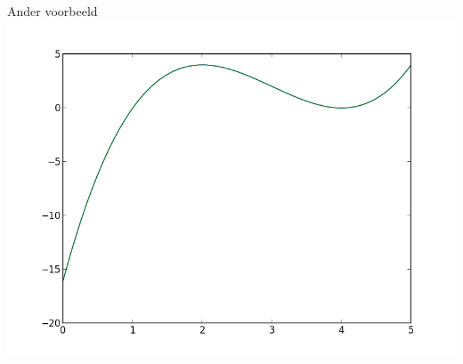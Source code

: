 \documentclass{beamer}
\begin{document}
\begin{frame}{Ander voorbeeld}
{  \includegraphics[width=0.5\linewidth]{24.png}}
\end{frame}
\end{document}
